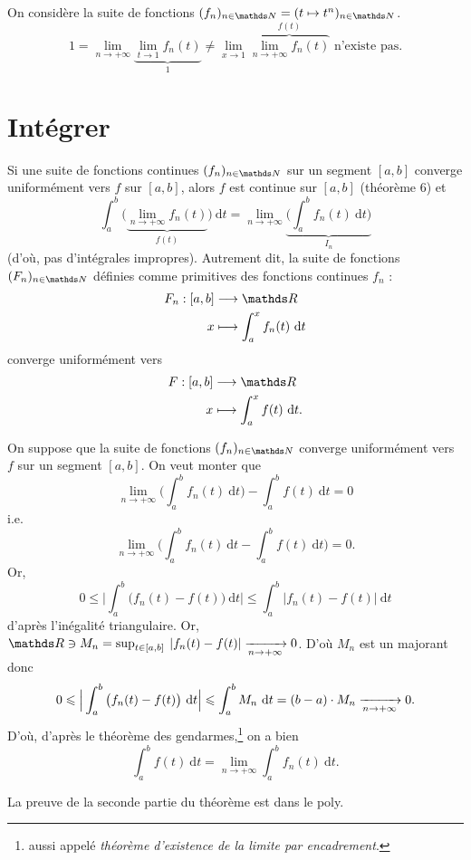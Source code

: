 \begin{cexm}
	On considère la suite de fonctions $(f_n)_{n\in\N} = (t\mapsto t^n)_{n\in\N}$. \[
		1 = \lim_{n\to +\infty} \underbrace{\lim_{t\to 1} f_n(t)}_{1} \neq \lim_{x\to 1} \overbrace{\lim_{n\to +\infty} f_n(t)}^{f(t)} \text{ n'existe pas}
	.\] 
\end{cexm}

\section{Intégrer}


\begin{thm}
	Si une suite de fonctions continues $(f_n)_{n\in\N}$\/ sur un segment $[a,b]$\/ converge uniformément vers $f$\/ sur $[a,b]$, alors $f$\/ est continue sur $[a,b]$\/ (théorème 6) et \[
		\int_{a}^{b} \Big(\underbrace{\lim_{n\to +\infty}f_n(t)}_{f(t)}\Big)~\mathrm{d}t = \lim_{n\to +\infty} \underbrace{\Big(\int_{a}^{b} f_n(t)~\mathrm{d}t\Big)}_{I_n}
	\] {\color{gray}(d'où, pas d'intégrales impropres)}.
	Autrement dit, la suite de fonctions $(F_n)_{n\in\N}$\/ définies comme primitives des fonctions continues $f_n$\/ : \begin{align*}
		F_n: [a,b] &\longrightarrow \R \\
		x &\longmapsto \int_{a}^{x} f_n(t)~\mathrm{d}t
	\end{align*}
	converge uniformément vers \begin{align*}
		F: [a,b] &\longrightarrow \R \\
		x &\longmapsto \int_{a}^{x} f(t)~\mathrm{d}t.
	\end{align*}
\end{thm}

\begin{prv}
	On suppose que la suite de fonctions $(f_n)_{n\in\N}$\/ converge uniformément vers $f$\/ sur un segment $[a,b]$. On veut monter que \[\lim_{n\to +\infty} \bigg(\int_{a}^{b} f_n(t)~\mathrm{d}t\bigg) - \int_{a}^{b} f(t)~\mathrm{d}t = 0\] i.e. \[\lim_{n\to +\infty} \bigg(\int_{a}^{b} f_n(t)~\mathrm{d}t - \int_{a}^{b} f(t)~\mathrm{d}t\bigg) = 0.\]
	Or, \[
		0 \le \Big| \int_{a}^{b} \big(f_n(t) - f(t)\big)~\mathrm{d}t \Big| \le \int_{a}^{b} \big|f_n(t) - f(t)\big|~\mathrm{d}t
	\] d'après l'inégalité triangulaire. Or, $\R\owns M_n = \sup_{t \in [a,b]}\:|f_n(t) - f(t)| \tendsto{n\to +\infty} 0$. D'où $M_n$\/ est un majorant donc \[
		0 \leqslant \Big| \int_{a}^{b} \big(f_n(t) - f(t)\big)~\mathrm{d}t \Big| \leqslant \int_{a}^{b} M_n~\mathrm{d}t = (b-a)\cdot M_n \xrightarrow[n\to +\infty]{} 0
	.\] D'où, d'après le théorème des gendarmes,\footnote{aussi appelé {\slshape théorème d'existence de la limite par encadrement}.} on a bien \[
		\int_{a}^{b} f(t)~\mathrm{d}t = \lim_{n\to +\infty} \int_{a}^{b} f_n(t)~\mathrm{d}t
	.\]

	La preuve de la seconde partie du théorème est dans le poly.
\end{prv}


